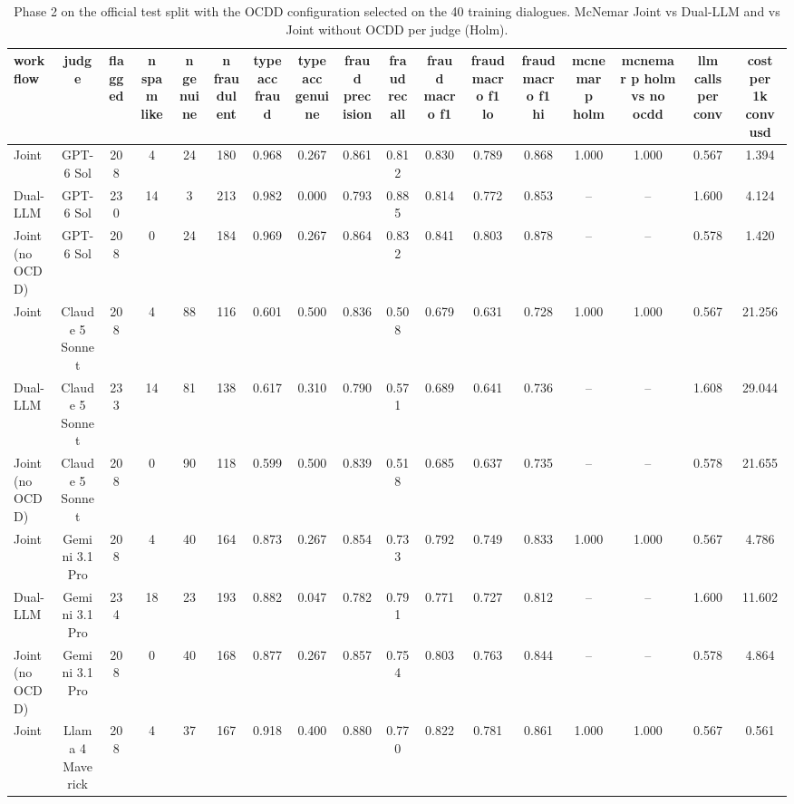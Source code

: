 \begin{table}[htbp]
\centering
\caption{Phase 2 on the official test split with the OCDD configuration selected on the 40 training dialogues. McNemar Joint vs Dual-LLM and vs Joint without OCDD per judge (Holm).}
\label{tab:table5_phase2_official}
\small
\begin{tabular}{lcccccccccccccccc}
\toprule
\textbf{workflow} & \textbf{judge} & \textbf{flagged} & \textbf{n spam like} & \textbf{n genuine} & \textbf{n fraudulent} & \textbf{type acc fraud} & \textbf{type acc genuine} & \textbf{fraud precision} & \textbf{fraud recall} & \textbf{fraud macro f1} & \textbf{fraud macro f1 lo} & \textbf{fraud macro f1 hi} & \textbf{mcnemar p holm} & \textbf{mcnemar p holm vs no ocdd} & \textbf{llm calls per conv} & \textbf{cost per 1k conv usd} \\
\midrule
Joint & GPT-6 Sol & 208 & 4 & 24 & 180 & 0.968 & 0.267 & 0.861 & 0.812 & 0.830 & 0.789 & 0.868 & 1.000 & 1.000 & 0.567 & 1.394 \\
Dual-LLM & GPT-6 Sol & 230 & 14 & 3 & 213 & 0.982 & 0.000 & 0.793 & 0.885 & 0.814 & 0.772 & 0.853 & -- & -- & 1.600 & 4.124 \\
Joint (no OCDD) & GPT-6 Sol & 208 & 0 & 24 & 184 & 0.969 & 0.267 & 0.864 & 0.832 & 0.841 & 0.803 & 0.878 & -- & -- & 0.578 & 1.420 \\
Joint & Claude 5 Sonnet & 208 & 4 & 88 & 116 & 0.601 & 0.500 & 0.836 & 0.508 & 0.679 & 0.631 & 0.728 & 1.000 & 1.000 & 0.567 & 21.256 \\
Dual-LLM & Claude 5 Sonnet & 233 & 14 & 81 & 138 & 0.617 & 0.310 & 0.790 & 0.571 & 0.689 & 0.641 & 0.736 & -- & -- & 1.608 & 29.044 \\
Joint (no OCDD) & Claude 5 Sonnet & 208 & 0 & 90 & 118 & 0.599 & 0.500 & 0.839 & 0.518 & 0.685 & 0.637 & 0.735 & -- & -- & 0.578 & 21.655 \\
Joint & Gemini 3.1 Pro & 208 & 4 & 40 & 164 & 0.873 & 0.267 & 0.854 & 0.733 & 0.792 & 0.749 & 0.833 & 1.000 & 1.000 & 0.567 & 4.786 \\
Dual-LLM & Gemini 3.1 Pro & 234 & 18 & 23 & 193 & 0.882 & 0.047 & 0.782 & 0.791 & 0.771 & 0.727 & 0.812 & -- & -- & 1.600 & 11.602 \\
Joint (no OCDD) & Gemini 3.1 Pro & 208 & 0 & 40 & 168 & 0.877 & 0.267 & 0.857 & 0.754 & 0.803 & 0.763 & 0.844 & -- & -- & 0.578 & 4.864 \\
Joint & Llama 4 Maverick & 208 & 4 & 37 & 167 & 0.918 & 0.400 & 0.880 & 0.770 & 0.822 & 0.781 & 0.861 & 1.000 & 1.000 & 0.567 & 0.561 \\

\end{tabular}
\end{table}
